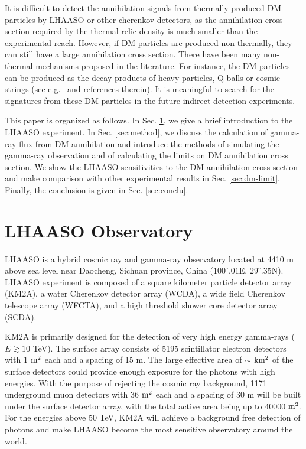 \documentclass[12pt,aps,prd,amsmath,amssymb,showpacs,floats,floatfix,nofootinbib]{revtex4-1}
\begin{document}
It is difficult to detect the annihilation signals from thermally produced DM particles by LHAASO or other cherenkov detectors, as the annihilation cross section required by the thermal relic density is much smaller than the experimental reach. However, if DM particles are produced non-thermally, they can still have a large annihilation cross section. There have been many non-thermal mechanisms proposed in the literature. For instance, the DM particles can be produced as the decay products of heavy particles, Q balls or cosmic strings (see e.g.~\cite{Moroi:1999zb,Fujii:2002kr,Jeannerot:1999yn} and references therein). It is meaningful to search for the signatures from these DM particles in the future indirect detection experiments.

This paper is organized as follows. In Sec. \ref{sec:LHAASO}, we give a brief introduction to the LHAASO experiment. In Sec.   \ref{sec:method}, we discuss the calculation of gamma-ray flux from DM annihilation and introduce the methods of simulating the gamma-ray observation and of calculating the limits on DM annihilation cross section. We show the LHAASO sensitivities to the DM annihilation cross section and make comparison with other experimental results in Sec. \ref{sec:dm-limit}. Finally, the conclusion is given in Sec.  \ref{sec:conclu}.

\section{LHAASO Observatory}\label{sec:LHAASO}
LHAASO is a hybrid cosmic ray and gamma-ray observatory located at 4410 m above sea level near Daocheng, Sichuan province, China ($100^{\circ}.01$E, $29^{\circ}.35$N). LHAASO experiment is composed of a square kilometer particle detector array (KM2A), a water Cherenkov detector array (WCDA), a wide field Cherenkov telescope array (WFCTA), and a high threshold shower core detector array (SCDA).

KM2A is primarily designed for the detection of very high energy gamma-rays ($E\gtrsim10$ TeV). The surface array consists of 5195 scintillator electron detectors with 1 $\rm m^{2}$ each and a spacing of 15 m. The large effective area of $\sim$ $\rm km^{2}$ of the surface detectors could provide enough exposure for the photons with high energies. With the purpose of rejecting the cosmic ray background, 1171 underground muon detectors with 36 $\rm m^{2}$ each and a spacing of 30 m will be built under the surface detector array, with the total active area being up to 40000 $\rm m^{2}$. For the energies above 50 TeV, KM2A will achieve a background free detection of photons and make LHAASO become the most sensitive observatory around the world.
\end{document}
